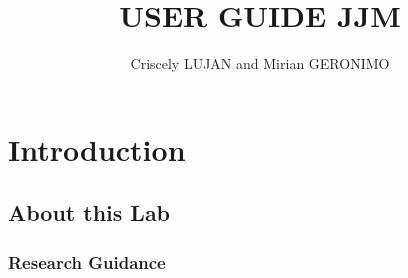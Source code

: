 \documentclass{article}
\title{USER GUIDE JJM}
\author{Criscely LUJAN and Mirian GERONIMO}
\begin{document}
\maketitle
\tableofcontents

\section{Introduction} 

\subsection{About this Lab}

\subsubsection{Research Guidance} 
\end{document}
